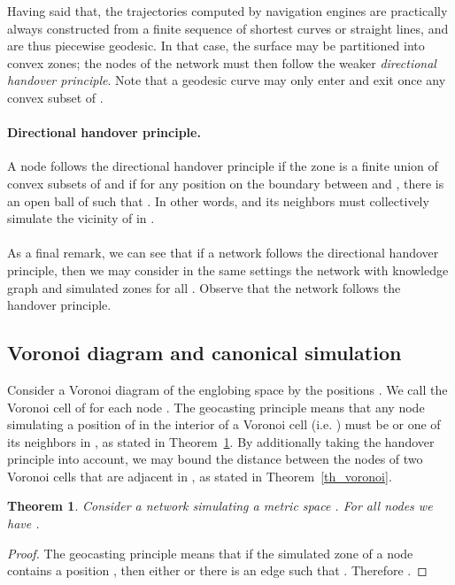 \documentclass{article}
\newtheorem{theorem}{Theorem}
\begin{document}
Having said that, the trajectories computed by navigation engines are practically always constructed from a finite sequence of shortest curves or straight lines, and are thus piecewise geodesic. In that case, the surface  may be partitioned into convex zones; the nodes of the network must then follow the weaker {\em directional handover principle}. Note that a geodesic curve may only enter and exit once any convex subset of .

\label{sub_directional}
\paragraph{Directional handover principle.} A node  follows the directional handover principle if the zone  is a finite union of convex subsets of  and
if for any position  on the boundary between  and , there is an open ball  of  such that .
In other words,  and its neighbors must collectively simulate the vicinity of  in .
\paragraph{}

As a final remark, we can see that if a network  follows the directional handover principle, then we may consider in the same settings the network  with knowledge graph  and simulated zones  for all . Observe that the network  follows the handover principle.

\subsection{Voronoi diagram and canonical simulation}
\label{sub_voronoi}
Consider a Voronoi diagram of the englobing space  by the positions . We call  the Voronoi cell of  for each node . The geocasting principle means that any node simulating a position  of  in the interior of a Voronoi cell  (i.e. ) must be  or one of its neighbors in , as stated in Theorem~\ref{th_voronoi1}. By additionally taking the handover principle into account, we may bound the distance between the nodes of two Voronoi cells that are adjacent in , as stated in Theorem~\ref{th_voronoi}.

\begin{theorem}
Consider a network  simulating a metric space . For all nodes  we have .
\label{th_voronoi1}
\end{theorem}
\begin{proof}
The geocasting principle means that if the simulated zone  of a node  contains a position , then either  or there is an edge  such that . Therefore . 
\end{proof}
\end{document}
